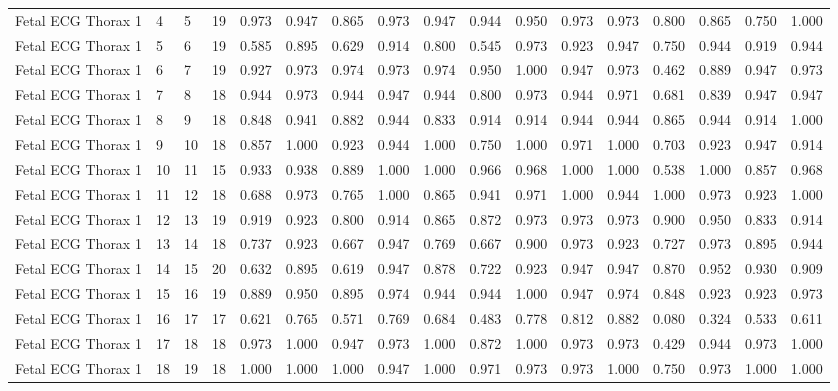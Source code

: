 \begin{longtable}{lllllllllllllllll}
Fetal ECG Thorax 1 & 4 & 5 & 19 & 0.973 & 0.947 & 0.865 & 0.973 & 0.947 & 0.944 & 0.950 & 0.973 & 0.973 & 0.800 & 0.865 & 0.750 & 1.000 \\
Fetal ECG Thorax 1 & 5 & 6 & 19 & 0.585 & 0.895 & 0.629 & 0.914 & 0.800 & 0.545 & 0.973 & 0.923 & 0.947 & 0.750 & 0.944 & 0.919 & 0.944 \\
Fetal ECG Thorax 1 & 6 & 7 & 19 & 0.927 & 0.973 & 0.974 & 0.973 & 0.974 & 0.950 & 1.000 & 0.947 & 0.973 & 0.462 & 0.889 & 0.947 & 0.973 \\
Fetal ECG Thorax 1 & 7 & 8 & 18 & 0.944 & 0.973 & 0.944 & 0.947 & 0.944 & 0.800 & 0.973 & 0.944 & 0.971 & 0.681 & 0.839 & 0.947 & 0.947 \\
Fetal ECG Thorax 1 & 8 & 9 & 18 & 0.848 & 0.941 & 0.882 & 0.944 & 0.833 & 0.914 & 0.914 & 0.944 & 0.944 & 0.865 & 0.944 & 0.914 & 1.000 \\
Fetal ECG Thorax 1 & 9 & 10 & 18 & 0.857 & 1.000 & 0.923 & 0.944 & 1.000 & 0.750 & 1.000 & 0.971 & 1.000 & 0.703 & 0.923 & 0.947 & 0.914 \\
Fetal ECG Thorax 1 & 10 & 11 & 15 & 0.933 & 0.938 & 0.889 & 1.000 & 1.000 & 0.966 & 0.968 & 1.000 & 1.000 & 0.538 & 1.000 & 0.857 & 0.968 \\
Fetal ECG Thorax 1 & 11 & 12 & 18 & 0.688 & 0.973 & 0.765 & 1.000 & 0.865 & 0.941 & 0.971 & 1.000 & 0.944 & 1.000 & 0.973 & 0.923 & 1.000 \\
Fetal ECG Thorax 1 & 12 & 13 & 19 & 0.919 & 0.923 & 0.800 & 0.914 & 0.865 & 0.872 & 0.973 & 0.973 & 0.973 & 0.900 & 0.950 & 0.833 & 0.914 \\
Fetal ECG Thorax 1 & 13 & 14 & 18 & 0.737 & 0.923 & 0.667 & 0.947 & 0.769 & 0.667 & 0.900 & 0.973 & 0.923 & 0.727 & 0.973 & 0.895 & 0.944 \\
Fetal ECG Thorax 1 & 14 & 15 & 20 & 0.632 & 0.895 & 0.619 & 0.947 & 0.878 & 0.722 & 0.923 & 0.947 & 0.947 & 0.870 & 0.952 & 0.930 & 0.909 \\
Fetal ECG Thorax 1 & 15 & 16 & 19 & 0.889 & 0.950 & 0.895 & 0.974 & 0.944 & 0.944 & 1.000 & 0.947 & 0.974 & 0.848 & 0.923 & 0.923 & 0.973 \\
Fetal ECG Thorax 1 & 16 & 17 & 17 & 0.621 & 0.765 & 0.571 & 0.769 & 0.684 & 0.483 & 0.778 & 0.812 & 0.882 & 0.080 & 0.324 & 0.533 & 0.611 \\
Fetal ECG Thorax 1 & 17 & 18 & 18 & 0.973 & 1.000 & 0.947 & 0.973 & 1.000 & 0.872 & 1.000 & 0.973 & 0.973 & 0.429 & 0.944 & 0.973 & 1.000 \\
Fetal ECG Thorax 1 & 18 & 19 & 18 & 1.000 & 1.000 & 1.000 & 0.947 & 1.000 & 0.971 & 0.973 & 0.973 & 1.000 & 0.750 & 0.973 & 1.000 & 1.000 \\

\end{longtable}
